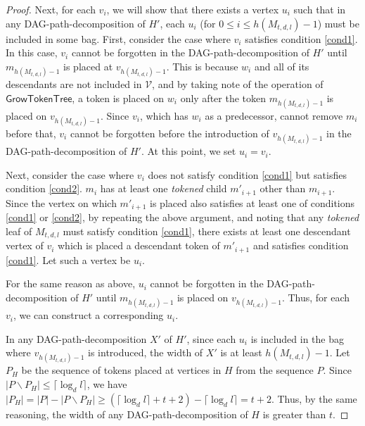 \documentclass[runningheads]{llncs}
\theoremstyle{plain}
\theoremstyle{definition}
\begin{document}
\begin{proof}
    Next, for each $v_i$, we will show that there exists a vertex $u_i$ such that in any DAG-path-decomposition of $H'$, each $u_i$ (for $0 \leq i \leq h(M_{t, d, l})-1$) must be included in some bag. First, consider the case where $v_i$ satisfies condition \ref{cond1}. In this case, $v_i$ cannot be forgotten in the DAG-path-decomposition of $H'$ until $m_{h(M_{t, d, l})-1}$ is placed at $v_{h(M_{t, d, l})-1}$. This is because $w_i$ and all of its descendants are not included in $\mathcal{V}$, and by taking note of the operation of $\mathsf{GrowTokenTree}$, a token is placed on $w_i$ only after the token $m_{h(M_{t, d, l})-1}$ is placed on $v_{h(M_{t, d, l})-1}$. Since $v_i$, which has $w_i$ as a predecessor, cannot remove $m_i$ before that, $v_i$ cannot be forgotten before the introduction of $v_{h(M_{t, d, l})-1}$ in the DAG-path-decomposition of $H'$. At this point, we set $u_i = v_i$. 
    
    Next, consider the case where $v_i$ does not satisfy condition \ref{cond1} but satisfies condition \ref{cond2}.  
    $m_i$ has at least one \textit{tokened} child $m'_{i+1}$ other than $m_{i+1}$.  
    Since the vertex on which $m'_{i+1}$ is placed also satisfies at least one of conditions \ref{cond1} or \ref{cond2}, by repeating the above argument, and noting that any \textit{tokened} leaf of $M_{t, d, l}$ must satisfy condition \ref{cond1}, there exists at least one descendant vertex of $v_i$ which is placed a descendant token of $m'_{i+1}$ and satisfies condition \ref{cond1}. Let such a vertex be $u_i$.  
    
    For the same reason as above, $u_i$ cannot be forgotten in the DAG-path-decomposition of $H'$ until $m_{h(M_{t, d, l})-1}$ is placed on $v_{h(M_{t, d, l})-1}$. Thus, for each $v_i$, we can construct a corresponding $u_i$.  
    
    In any DAG-path-decomposition $X'$ of $H'$, since each $u_i$ is included in the bag where $v_{h(M_{t, d, l})-1}$ is introduced, the width of $X'$ is at least $h(M_{t, d, l})-1$. Let $P_H$ be the sequence of tokens placed at vertices in $H$ from the sequence $P$. Since $|P \backslash P_H| \leq \lceil \log_d l \rceil$, we have $|P_H| = |P| - |P \backslash P_H| \geq (\lceil \log_d l \rceil + t + 2) - \lceil \log_d l \rceil = t + 2$. Thus, by the same reasoning, the width of any DAG-path-decomposition of $H$ is greater than $t$.
\end{proof}
\end{document}
